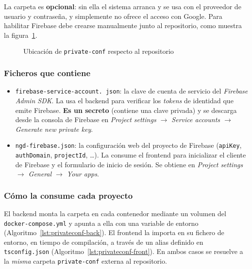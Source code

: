 La carpeta es \textbf{opcional}: sin ella el sistema arranca y se usa con el
proveedor de usuario y contraseña, y simplemente no ofrece el acceso con
Google. Para habilitar Firebase debe crearse manualmente junto al repositorio,
como muestra la figura~\ref{fig:tree-privateconf}.

\begin{figure}[!htbp]
\centering
\begin{minipage}{0.8\textwidth}
\end{minipage}
\caption{Ubicación de \texttt{private-conf} respecto al repositorio}
\label{fig:tree-privateconf}
\end{figure}

\subsubsection{Ficheros que contiene}
\begin{itemize}
  \item \texttt{firebase-\allowbreak service-\allowbreak account.\allowbreak
        json}: la clave de cuenta de servicio del \emph{Firebase Admin SDK}.
        La usa el backend para verificar los \emph{tokens} de identidad que
        emite Firebase. \textbf{Es un secreto} (contiene una clave privada) y
        se descarga desde la consola de Firebase en \emph{Project settings
        $\rightarrow$ Service accounts $\rightarrow$ Generate new private key}.
  \item \texttt{ngd-\allowbreak firebase.\allowbreak json}: la configuración
        web del proyecto de Firebase (\texttt{apiKey}, \texttt{auth\allowbreak Domain},
        \texttt{projectId}, \dots). La consume el frontend para inicializar el
        cliente de Firebase y el formulario de inicio de sesión. Se obtiene en
        \emph{Project settings $\rightarrow$ General $\rightarrow$ Your apps}.
\end{itemize}

\subsubsection{Cómo la consume cada proyecto}
El backend monta la carpeta en cada contenedor mediante un volumen del
\texttt{docker-\allowbreak compose.\allowbreak yml} y apunta a ella con una
variable de entorno (Algoritmo~\ref{lst:privateconf-back}). El frontend la
importa en su fichero de entorno, en tiempo de compilación, a través de un
alias definido en \texttt{tsconfig.json}
(Algoritmo~\ref{lst:privateconf-front}). En ambos casos se resuelve a la
\emph{misma} carpeta \texttt{private-conf} externa al repositorio.

